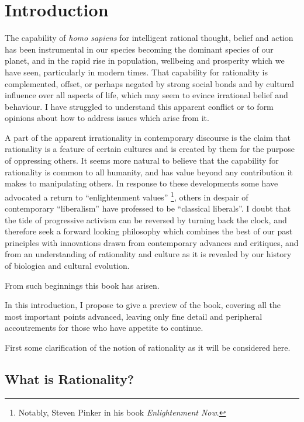 \mainmatter
\chapter{Introduction }

The capability of \emph{homo sapiens} for intelligent rational thought, belief and action has been instrumental in our species becoming the dominant species of our planet, and in the rapid rise in population, wellbeing and prosperity which we have seen, particularly in modern times.
That capability for rationality is complemented, offset, or perhaps negated by strong social bonds and by cultural influence over all aspects of life, which may seem to evince irrational belief and behaviour.
I have struggled to understand this apparent conflict or to form opinions about how to address issues which arise from it.

A part of the apparent irrationality in contemporary discourse is the claim that rationality is a feature of certain cultures and is created by them for the purpose of oppressing others.
It seems more natural to believe that the capability for rationality is common to all humanity, and has value beyond any contribution it makes to manipulating others.
In response to these developments some have advocated a return to ``enlightenment values'' \footnote{Notably, Steven Pinker in his book \emph{Enlightenment Now}\cite{pinker-en}.}, others in despair of contemporary ``liberalism'' have professed to be ``classical liberals''.
I doubt that the tide of progressive activism can be reversed by turning back the clock, and therefore seek a forward looking philosophy which combines the best of our past principles with innovations drawn from contemporary advances and critiques, and from an understanding of rationality and culture as it is revealed by our history of biologica and cultural evolution.

From such beginnings this book has arisen.

In this introduction, I propose to give a preview of the book, covering all the most important points advanced, leaving only fine detail and peripheral accoutrements for those who have appetite to continue.

First some clarification of the notion of rationality as it will be considered here.

\section{What is Rationality?}

